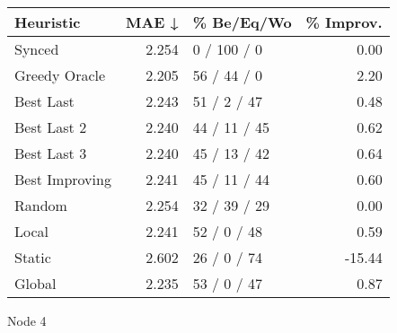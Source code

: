 \begin{tabular}{lrlr}
\toprule
\textbf{Heuristic} & \textbf{MAE ↓} & \textbf{\% Be/Eq/Wo} & \textbf{\% Improv.} \\
\midrule
            Synced &          2.254 &          0 / 100 / 0 &                0.00 \\
     Greedy Oracle &          2.205 &          56 / 44 / 0 &                2.20 \\
         Best Last &          2.243 &          51 / 2 / 47 &                0.48 \\
       Best Last 2 &          2.240 &         44 / 11 / 45 &                0.62 \\
       Best Last 3 &          2.240 &         45 / 13 / 42 &                0.64 \\
    Best Improving &          2.241 &         45 / 11 / 44 &                0.60 \\
            Random &          2.254 &         32 / 39 / 29 &                0.00 \\
             Local &          2.241 &          52 / 0 / 48 &                0.59 \\
            Static &          2.602 &          26 / 0 / 74 &              -15.44 \\
            Global &          2.235 &          53 / 0 / 47 &                0.87 \\
\bottomrule
\end{tabular}
\caption{Node 4}
\label{tab:hr_non_lr01_le1_bs2_4}
